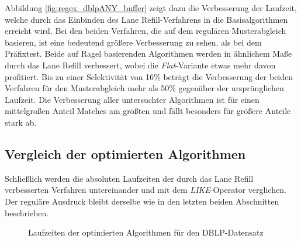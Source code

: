 Abbildung \ref{fig:regex_dblpANY_buffer} zeigt dazu die Verbesserung der Laufzeit, welche durch das Einbinden des Lane Refill-Verfahrens in die Basisalgorithmen erreicht wird.
Bei den beiden Verfahren, die auf dem regulären Musterabgleich basieren, ist eine bedeutend größere Verbesserung zu sehen, als bei dem Präfixtest.
Beide auf Ragel basierenden Algorithmen werden in ähnlichem Maße durch das Lane Refill verbessert, wobei die \emph{Flat}-Variante etwas mehr davon profitiert.
Bis zu einer Selektivität von 16\% beträgt die Verbesserung der beiden Verfahren für den Musterabgleich mehr als 50\% gegenüber der ursprünglichen Laufzeit.
Die Verbesserung aller untersuchter Algorithmen ist für einen mittelgroßen Anteil Matches am größten und fällt besonders für größere Anteile stark ab.

\subsection{Vergleich der optimierten Algorithmen}
\label{sec:regex_evaluation_beobachtung_3}

Schließlich werden die absoluten Laufzeiten der durch das Lane Refill verbesserten Verfahren untereinander und mit dem \emph{LIKE}-Operator verglichen.
Der reguläre Ausdruck bleibt derselbe wie in den letzten beiden Abschnitten beschrieben.

\begin{figure}[ht]
	\centering
	\caption{Laufzeiten der optimierten Algorithmen für den DBLP-Datensatz}
	\label{fig:regex_dblpANY_optimal}
\end{figure}

